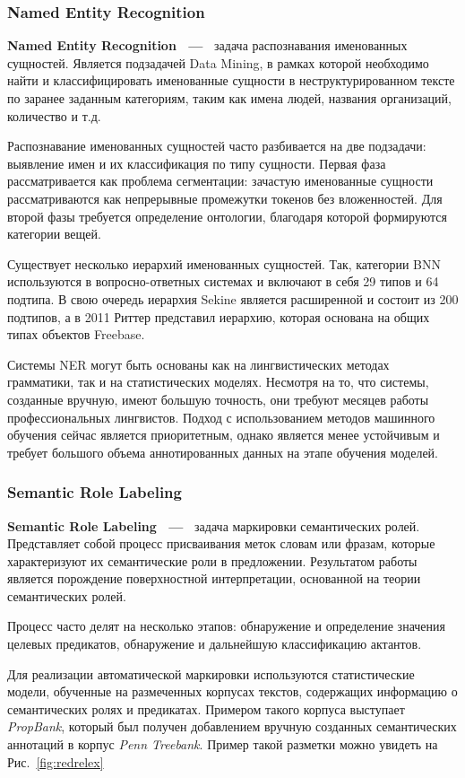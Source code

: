 \subsubsection{Named Entity Recognition}
\textbf{Named Entity Recognition  ~---~} задача распознавания именованных сущностей. 
Является подзадачей Data Mining, в рамках которой необходимо найти и классифицировать именованные сущности в неструктурированном тексте по заранее заданным категориям, таким как имена людей, названия организаций, количество и т.д.

Распознавание именованных сущностей часто разбивается на две подзадачи: выявление имен и их классификация по типу сущности. Первая фаза рассматривается как проблема сегментации: зачастую именованные сущности рассматриваются как непрерывные промежутки токенов без вложенностей. Для второй фазы требуется определение онтологии, благодаря которой формируются категории вещей.

Существует несколько иерархий именованных сущностей. Так, категории BNN используются в вопросно-ответных системах и включают в себя 29 типов и 64 подтипа. В свою очередь иерархия Sekine является расширенной и состоит из 200 подтипов, а в 2011 Риттер представил иерархию, которая основана на общих типах объектов Freebase. 

Системы NER могут быть основаны как на лингвистических методах грамматики, так и на статистических моделях. Несмотря на то, что системы, созданные вручную, имеют большую точность, они требуют месяцев работы профессиональных лингвистов. Подход с использованием методов машинного обучения сейчас является приоритетным, однако является менее устойчивым и требует большого объема аннотированных данных на этапе обучения моделей. 

\subsubsection{Semantic Role Labeling}
\textbf{Semantic Role Labeling  ~---~} задача маркировки семантических ролей. Представляет собой процесс присваивания меток словам или фразам, которые характеризуют их семантические роли в предложении. Результатом работы является порождение поверхностной интерпретации, основанной на теории семантических ролей.

Процесс часто делят на несколько этапов:  обнаружение и определение значения целевых предикатов, обнаружение и дальнейшую классификацию актантов. 

Для реализации автоматической маркировки используются статистические модели, обученные на размеченных корпусах текстов, содержащих информацию о семантических ролях и предикатах. Примером такого корпуса выступает \emph{PropBank}, который был получен добавлением вручную созданных семантических аннотаций в корпус \emph{Penn Treebank}. Пример такой разметки можно увидеть на Рис.~\ref{fig:redrelex}

